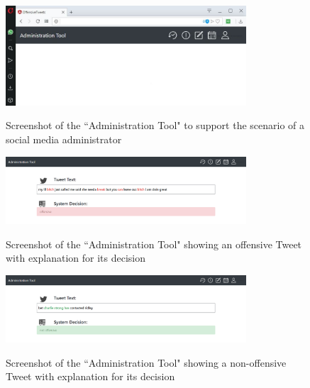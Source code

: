 \begin{figure} [H]
	\centering
	\includegraphics[width=0.8\textwidth]{img/administrationTool.JPG}\\
	\caption{Screenshot of the ``Administration Tool" to support the scenario of a social media administrator}
	\label{fig:admin_tool}
\end{figure}
\begin{figure} [H]
	\centering
	\includegraphics[width=0.8\textwidth]{img/pg_2_12.PNG}\\
	\caption{Screenshot of the ``Administration Tool" showing an offensive Tweet with explanation for its decision}
	\label{fig:admin_tool_offensive}
\end{figure}
\begin{figure} [H]
	\centering
	\includegraphics[width=0.8\textwidth]{img/pg_2_0.PNG}\\
	\caption{Screenshot of the ``Administration Tool" showing a non-offensive Tweet with explanation for its decision}
	\label{fig:admin_tool_not_offensive}
\end{figure}



